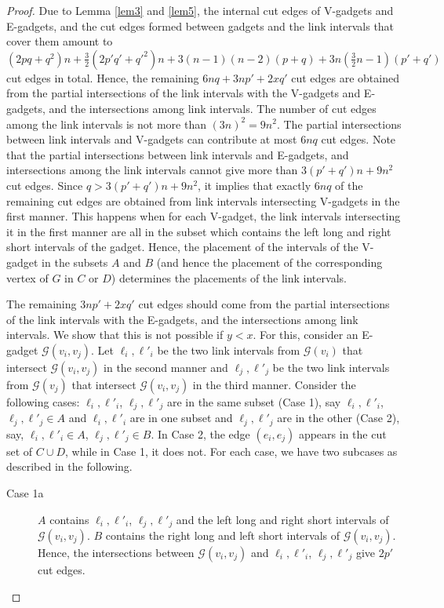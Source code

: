 \documentclass[11pt]{article}
\begin{document}
\begin{proof}
Due to Lemma \ref{lem3} and \ref{lem5}, the internal cut edges of V-gadgets and E-gadgets, and the cut edges formed between gadgets and the link intervals that cover them amount to $(2pq + q^2)n +  \frac{3}{2}(2p'q' + q'^2)n +  3(n-1)(n-2)(p+q) + 3n(\frac{3}{2}n-1)(p'+q')$ cut edges in total. Hence, the remaining $6nq + 3np' + 2xq'$ cut edges are obtained from the partial intersections of the link intervals with the V-gadgets and E-gadgets, and the intersections among link intervals. The number of cut edges among the link intervals is not more than $(3n)^2 = 9n^2$. The partial intersections between link intervals and V-gadgets can contribute at most $6nq$ cut edges. Note that the partial intersections between link intervals and E-gadgets, and intersections among the link intervals cannot give more than $3(p' + q')n + 9n^2$ cut edges. Since $q > 3(p' + q')n + 9n^2$, it implies that exactly $6nq$ of the remaining cut edges are obtained from  link intervals intersecting V-gadgets in the first manner. This happens when for each V-gadget, the link intervals intersecting it in the first manner are all in the subset which contains the left long and right short intervals of the gadget. Hence, the placement of the intervals of the V-gadget in the subsets $A$ and $B$ (and hence the placement of the corresponding vertex of $G$ in $C$ or $D$) determines the placements of the link intervals. 


The remaining $3np' + 2xq'$ cut edges should come from the partial intersections of the link intervals with the E-gadgets, and the intersections among link intervals. We show that this is not possible if $y < x$. For this, consider an E-gadget $\mathcal{G}(v_i, v_j)$. Let $\ell_i, \ell'_i$ be the two link intervals from $\mathcal{G}(v_i)$ that intersect $\mathcal{G}(v_i, v_j)$ in the second manner and  $\ell_j, \ell'_j$ be the two link intervals from $\mathcal{G}(v_j)$ that intersect $\mathcal{G}(v_i, v_j)$ in the third manner. Consider the following cases: $\ell_i, \ell'_i$, $\ell_j, \ell'_j$ are in the same subset (Case 1), say $\ell_i, \ell'_i$, $\ell_j, \ell'_j \in A$  and $\ell_i, \ell'_i$ are in one subset and $\ell_j, \ell'_j$ are in the other (Case 2), say, $\ell_i, \ell'_i \in A$, $\ell_j, \ell'_j \in B$. In Case 2, the edge $(e_i, e_j)$ appears in the cut set of $C \cup D$, while in Case 1, it does not. For each case, we have two subcases as described in the following.

\begin{description}
 \item [Case 1a] $A$ contains $\ell_i, \ell'_i$, $\ell_j, \ell'_j$ and the left long and right short intervals of $\mathcal{G}(v_i, v_j)$. $B$ contains the right long and left short intervals of $\mathcal{G}(v_i, v_j)$. Hence, the intersections between $\mathcal{G}(v_i, v_j)$ and $\ell_i, \ell'_i$, $\ell_j, \ell'_j$ give $2p'$ cut edges. 
 

\end{description}
\end{proof}
\end{document}
